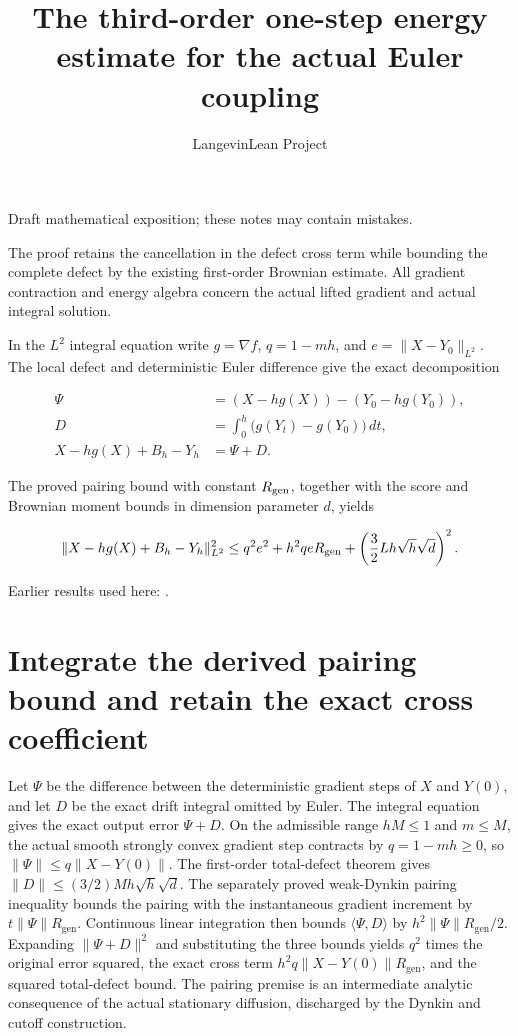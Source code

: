 \documentclass[11pt,a4paper]{article}
\title{\texorpdfstring{The third-order one-step energy estimate for the actual Euler coupling}{The third-order one-step energy estimate for the actual Euler coupling}}
\author{LangevinLean Project}
\date{}
\begin{document}
\maketitle
Draft mathematical exposition; these notes may contain mistakes.


The proof retains the cancellation in the defect cross term while bounding the complete defect by the existing first-order Brownian estimate. All gradient contraction and energy algebra concern the actual lifted gradient and actual integral solution.



In the \(L^2\) integral equation write \(g=\nabla f\), \(q=1-mh\), and \(e=\|X-Y_0\|_{L^2}\). The local defect and deterministic Euler difference give the exact decomposition


\[\begin{aligned}\Psi&=(X-hg(X))-(Y_0-hg(Y_0)),\\D&=\int_0^h\bigl(g(Y_t)-g(Y_0)\bigr)\,dt,\\X-hg(X)+B_h-Y_h&=\Psi+D.\end{aligned}\]


The proved pairing bound with constant \(R_{\rm gen}\), together with the score and Brownian moment bounds in dimension parameter \(d\), yields


\[\|X-hg(X)+B_h-Y_h\|_{L^2}^{2}\le q^2e^2+h^2qeR_{\rm gen}+\left(\frac32Lh\sqrt h\sqrt d\right)^2.\]

Earlier results used here: \cite[Section~3.13]{LangevinLean2026ULASC}.

\section{\texorpdfstring{Integrate the derived pairing bound and retain the exact cross coefficient}{Integrate the derived pairing bound and retain the exact cross coefficient}}


Let \(\Psi\) be the difference between the deterministic gradient steps of \(X\) and \(Y(0)\), and let \(D\) be the exact drift integral omitted by Euler. The integral equation gives the exact output error \(\Psi +D\). On the admissible range \(hM\le1\) and \(m\le M\), the actual smooth strongly convex gradient step contracts by \(q=1-mh\ge 0\), so \(\|\Psi \|\le q\|X-Y(0)\|\). The first-order total-defect theorem gives \(\|D\|\le (3/2)Mh\sqrt h\sqrt d\). The separately proved weak-Dynkin pairing inequality bounds the pairing with the instantaneous gradient increment by \(t\|\Psi \|R_{\mathrm{gen}}\). Continuous linear integration then bounds \(\langle \Psi ,D\rangle\) by \(h^{2}\|\Psi \|R_{\mathrm{gen}}/2\). Expanding \(\|\Psi +D\|^{2}\) and substituting the three bounds yields \(q^{2}\) times the original error squared, the exact cross term \(h^{2}q\|X-Y(0)\|R_{\mathrm{gen}}\), and the squared total-defect bound. The pairing premise is an intermediate analytic consequence of the actual stationary diffusion, discharged by the Dynkin and cutoff construction.
\end{document}
